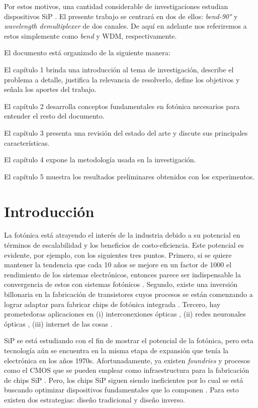 Por estos motivos, una cantidad considerable de investigaciones estudian dispositivos SiP \citep{Molesky2018}.
El presente trabajo se centrará en dos de ellos: \emph{bend-90°} y \emph{wavelength demultiplexer} de dos canales.
De aquí en adelante nos referiremos a estos simplemente como \emph{bend} y WDM, respectivamente.


El documento está organizado de la siguiente manera:

El capítulo 1 brinda una introducción al tema de investigación, describe el problema a detalle, justifica la relevancia de resolverlo, define los objetivos y señala los aportes del trabajo.

El capítulo 2 desarrolla conceptos fundamentales en fotónica necesarios para entender el resto del documento.

El capítulo 3 presenta una revisión del estado del arte y discute sus principales características.

El capítulo 4 expone la metodología usada en la investigación.

El capítulo 5 muestra los resultados preliminares obtenidos con los experimentos.

\section{Introducción}

La fotónica está atrayendo el interés de la industria debido a su potencial en términos de escalabilidad y los beneficios de costo-eficiencia. 
Este potencial es evidente, por ejemplo, con los siguientes tres puntos. 
Primero, si se quiere mantener la tendencia que cada 10 años se mejore en un factor de 1000 el rendimiento de los sistemas electrónicos, entonces parece ser indispensable la convergencia de estos con sistemas fotónicos \citep{Glick2018}. 
Segundo, existe una inversión billonaria en la fabricación de transistores cuyos procesos se están comenzando a lograr adaptar para fabricar chips de fotónica integrada \citep{LukasChrostowski2010}.
Tercero, hay prometedoras aplicaciones en (i) interconexiones ópticas \citep{Shen2019}, (ii) redes neuronales ópticas \citep{Shen2017}, (iii) internet de las cosas \citep{Glick2018}.
 

SiP se está estudiando con el fin de mostrar el potencial de la fotónica, pero esta tecnología aún se encuentra en la misma etapa de expansión que tenía la electrónica en los años 1970s.
Afortunadamente, ya existen \emph{foundries} y procesos como el CMOS que se pueden emplear como infraestructura para la fabricación de chips SiP \citep{LukasChrostowski2010}.
Pero, los chips SiP siguen siendo ineficientes por lo cual se está buscando optimizar dispositivos fundamentales que lo componen \citep{Vuckovic2019}.
Para esto existen dos estrategias: diseño tradicional y diseño inverso.


